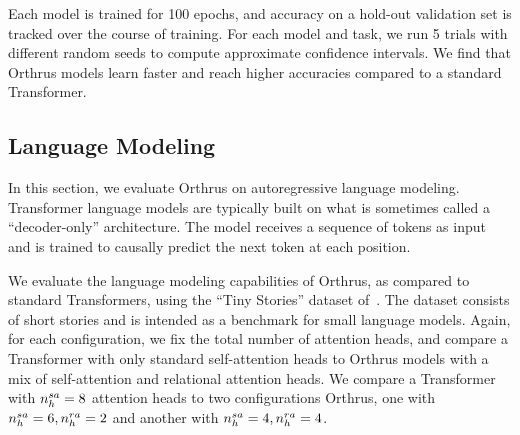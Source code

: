 Each model is trained for 100 epochs, and accuracy on a hold-out validation set is tracked over the course of training. For each model and task, we run 5 trials with different random seeds to compute approximate confidence intervals. We find that Orthrus models learn faster and reach higher accuracies compared to a standard Transformer.


\subsection{Language Modeling}\label{ssec:tiny_stories}

In this section, we evaluate Orthrus on autoregressive language modeling. Transformer language models are typically built on what is sometimes called a ``decoder-only'' architecture. The model receives a sequence of tokens as input and is trained to causally predict the next token at each position.

We evaluate the language modeling capabilities of Orthrus, as compared to standard Transformers, using the ``Tiny Stories'' dataset of~\citet{eldanTinyStoriesHowSmall2023}. The dataset consists of short stories and is intended as a benchmark for small language models. Again, for each configuration, we fix the total number of attention heads, and compare a Transformer with only standard self-attention heads to Orthrus models with a mix of self-attention and relational attention heads. We compare a Transformer with $n_h^{sa} = 8$ attention heads to two configurations Orthrus, one with $n_h^{sa} = 6, n_h^{ra} = 2$ and another with $n_h^{sa} = 4, n_h^{ra} = 4$.

